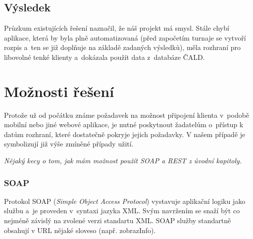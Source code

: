 \subsection{Výsledek}

\indent

Průzkum existujících řešení naznačil, že náš projekt má smysl. Stále chybí aplikace,
která by byla plně automatizovaná (před započetím turnaje se vytvoří rozpis a~ten se
již doplňuje na základě zadaných výsledků), měla rozhraní pro libovolné tenké klienty
a~dokázala použít data z~databáze ČALD.

\section{Možnosti řešení}

\indent

Protože už od počátku známe požadavek na možnost připojení klienta v~podobě mobilní nebo jiné webové aplikace,
je nutné poskytnout žadatelům o~přístup k datům rozhraní, které dostatečně pokryje jejich požadavky.
V našem případě je symbolizují již výše zmíněné případy užití.


\textit{Nějaký kecy o tom, jak mám možnost použít SOAP a REST z úvodní kapitoly.}

\subsubsection*{SOAP}

\indent

Protokol SOAP (\textit{Simple Object Access Protocol}) vystavuje aplikační logiku jako službu
a~je proveden v~syntaxi jazyka XML. Svým navržením se snaží
být co nejméně závislý na zvolené verzi standartu XML.
SOAP služby standartně obsahují v URL nějaké sloveso (např. zobrazInfo).
